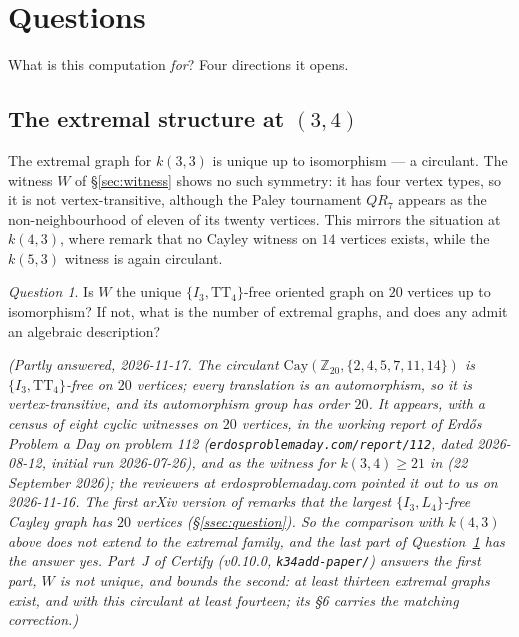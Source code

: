 \documentclass[11pt]{amsart}
\newcommand{\TT}[1]{\mathrm{TT}_{#1}}
\newcommand{\I}[1]{I_{#1}}
\theoremstyle{plain}
\theoremstyle{definition}
\theoremstyle{remark}
\newtheorem{question}[theorem]{Question}
\begin{document}
\section{Questions}\label{sec:questions}

What is this computation \emph{for}? Four directions it opens.

\subsection{The extremal structure at $(3,4)$}\label{ssec:qstruct}
The extremal graph for $k(3,3)$ is unique up to isomorphism
\cite[Lemma~3.1]{IRW21} --- a circulant. The witness $W$ of
\S\ref{sec:witness} shows no
such symmetry: it has four vertex types, so it is not vertex-transitive,
although the Paley tournament $QR_7$ appears as the non-neighbourhood of
eleven of its twenty vertices. This mirrors the situation at $k(4,3)$,
where \cite{IRW21} remark that no Cayley witness on $14$ vertices
exists, while the $k(5,3)$ witness is again circulant.

\begin{question}\label{q:unique}
Is $W$ the unique $\{\I3,\TT{4}\}$-free oriented graph on $20$ vertices
up to isomorphism? If not, what is the number of extremal graphs, and
does any admit an algebraic description?
\end{question}

\noindent\emph{(Partly answered, 2026-11-17. The circulant
$\mathrm{Cay}(\mathbb{Z}_{20},\{2,4,5,7,11,14\})$ is
$\{\I3,\TT{4}\}$-free on $20$ vertices; every translation is an
automorphism, so it is vertex-transitive, and its automorphism group has
order $20$. It appears, with a census of eight cyclic witnesses on $20$
vertices, in the working report of Erd\H{o}s Problem a Day on problem 112
(\texttt{erdosproblemaday.com/report/112}, dated 2026-08-12, initial run
2026-07-26), and as the witness for $k(3,4)\ge 21$ in \cite{MF26}
(22 September 2026); the reviewers at erdosproblemaday.com pointed it out
to us on 2026-11-16.
The first arXiv version of \cite{IRW21} remarks that the largest
$\{\I3,L_4\}$-free Cayley graph has $20$ vertices
(\S\ref{ssec:question}). So the comparison with $k(4,3)$ above does not
extend to the extremal family, and the last part of
Question~\ref{q:unique} has the answer yes. Part~J of Certify (v0.10.0,
\texttt{k34add-paper/}) answers the first part, $W$ is not unique, and
bounds the second: at least thirteen extremal graphs exist, and with this
circulant at least fourteen; its \S6 carries the matching correction.)}
\end{document}
